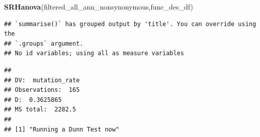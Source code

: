 \documentclass[
]{article}
\newenvironment{Shaded}{\begin{snugshade}}{\end{snugshade}}
\newcommand{\KeywordTok}[1]{\textcolor[rgb]{0.13,0.29,0.53}{\textbf{#1}}}
\newcommand{\NormalTok}[1]{#1}
\begin{document}
\begin{Shaded}
\begin{Highlighting}[]
\KeywordTok{SRHanova}\NormalTok{(filtered_all_ann_nonsynonymous,func_des_df)}
\end{Highlighting}
\end{Shaded}

\begin{verbatim}
## `summarise()` has grouped output by 'title'. You can override using the
## `.groups` argument.
## No id variables; using all as measure variables
\end{verbatim}

\begin{verbatim}
## 
## DV:  mutation_rate 
## Observations:  165 
## D:  0.3625865 
## MS total:  2282.5 
## 
## [1] "Running a Dunn Test now"
\end{verbatim}
\end{document}
